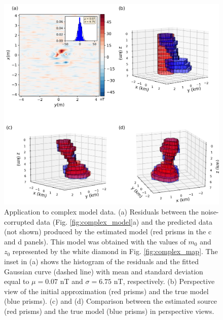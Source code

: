 \begin{figure}
    \centering
    \includegraphics[width=\linewidth]{figures/complex_results.png}
    \caption{Application to complex model data. (a) Residuals between the noise-corrupted data (Fig. \ref{fig:complex_model}a) and the predicted data (not shown) produced by the estimated model (red prisms in the c and d panels). This model was obtained with 
    the values of $ m_0 $ and $ z_0 $ represented by the white diamond in Fig. \ref{fig:complex_map}. The inset in (a) shows the histogram of the residuals and the fitted Gaussian curve (dashed line) with mean and standard deviation equal to $\mu = 0.07$ nT and $\sigma=6.75$ nT, respectively. (b) Perspective view of the initial approximation (red prisms) and the true model (blue prisms). (c) and (d) Comparison between the estimated source (red prisms) and the true model (blue prisms) in perspective views. 
}
    \label{fig:complex_result}
\end{figure}


